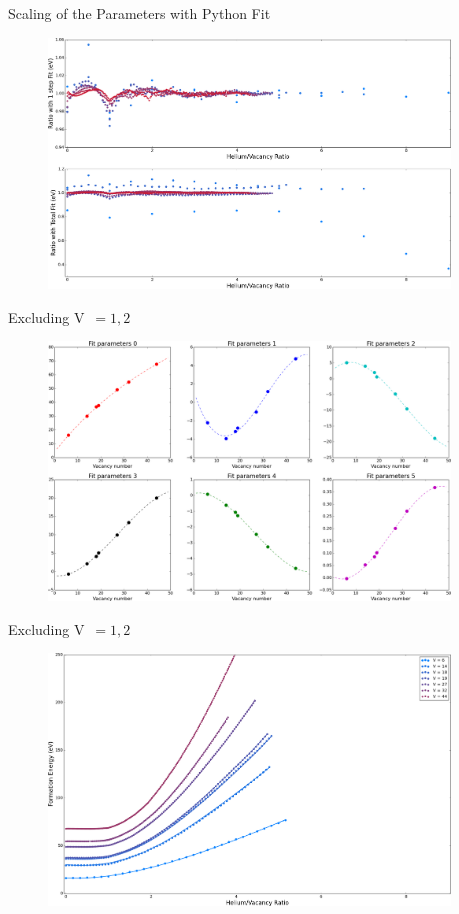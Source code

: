 \documentclass[10pt]{beamer}
\begin{document}
\begin{frame}{Scaling of the Parameters with Python Fit}
	\begin{figure}
        \includegraphics[width=0.95\textwidth]{ratioIN}
    \end{figure}
\end{frame}

\begin{frame}{Excluding V~$=1, 2$}
	\begin{figure}
        \includegraphics[width=0.95\textwidth]{parametersEX}
    \end{figure}
\end{frame}

\begin{frame}{Excluding V~$=1, 2$}
	\begin{figure}
        \includegraphics[width=0.95\textwidth]{energyEX}
    \end{figure}
\end{frame}
\end{document}
